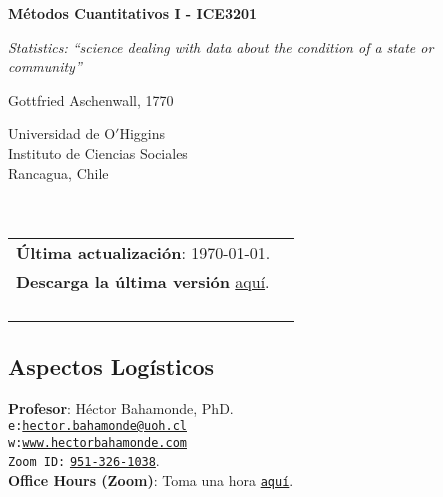 \documentclass[letterpaper]{article}
\def\name{M\'etodos Cuantitativos I - ICE3201}
\begin{document}

\centerline{\huge \bf \name}

\epigraph{\emph{Statistics: ``science dealing with data about the condition of a state or community''}}{Gottfried Aschenwall, 1770}


\vspace{0.25in}

\begin{minipage}{0.45\linewidth}
 Universidad de O$'$Higgins \\
  Instituto de Ciencias Sociales \\
  Rancagua, Chile\\
  \\
  \\

\end{minipage}
\hspace{4cm}\begin{minipage}{0.45\linewidth}
  \begin{tabular}{ll}
{\bf \'Ultima actualizaci\'on}: \today. \\
 {\bf Descarga la \'ultima versi\'on} \href{https://github.com/hbahamonde/Metodos_de_Investigacion/raw/master/Bahamonde_Metodos_de_Investigacion.pdf}{aqu\'i}.%
    \\
    \\
    \\
    \\
    \\
  \end{tabular}
\end{minipage}



\subsection*{Aspectos Log\'isticos}


\vspace{1mm}
{\bf Profesor}: H\'ector Bahamonde, PhD.\\
\texttt{e:}\href{mailto:hector.bahamonde@uoh.cl}{\texttt{hector.bahamonde@uoh.cl}}\\
\texttt{w:}\href{http://www.hectorbahamonde.com}{\texttt{www.hectorbahamonde.com}}\\
\texttt{Zoom ID:} \href{https://us02web.zoom.us/j/9513261038?pwd=S3BSWXQxZW11NC9CRjRoMmd0TkpEZz09}{\texttt{951-326-1038}}.\\
{\bf Office Hours (Zoom)}: Toma una hora \href{https://calendly.com/bahamonde/officehours}{\texttt{aqu\'i}}.
\end{document}
